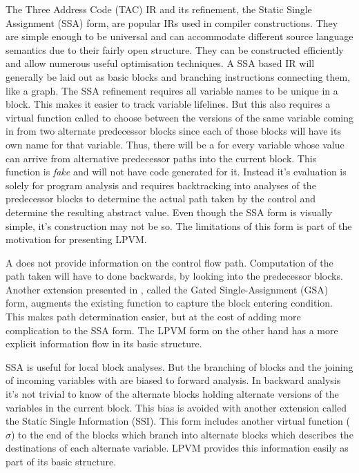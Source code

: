 The Three Address Code (TAC) IR and its refinement, the Static Single
Assignment (SSA) form, are popular IRs used in compiler constructions. They are
simple enough to be universal and can accommodate different source language
semantics due to their fairly open structure. They can be constructed
efficiently \citep{cytronSSA} and allow numerous useful optimisation
techniques. A SSA based IR will generally be laid out as basic blocks and
branching instructions connecting them, like a graph. The SSA refinement
requires all variable names to be unique in a block. This makes it easier to
track variable lifelines. But this also requires a virtual function called
\phif to choose between the versions of the same variable coming in from two
alternate predecessor blocks since each of those blocks will have its own name
for that variable. Thus, there will be a \phif for every variable whose value
can arrive from alternative predecessor paths into the current block. This
function is \textit{fake} and will not have code generated for it. Instead it's
evaluation is solely for program analysis and requires backtracking into
analyses of the predecessor blocks to determine the actual path taken by the
control and determine the resulting abstract value. Even though the SSA form is
visually simple, it's construction may not be so. The limitations of this form
is part of the motivation for presenting LPVM.

A \phif does not provide information on the control flow path. Computation of
the path taken will have to done backwards, by looking into the predecessor
blocks. Another extension presented in \cite{gsa}, called the Gated Single-Assignment
(GSA) form, augments the existing \phif function to capture the block
entering condition. This makes path determination easier, but at the cost of
adding more complication to the SSA form. The LPVM form on the other hand has a
more explicit information flow in its basic structure.

SSA is useful for local block analyses. But the branching of blocks and the
joining of incoming variables with \phifs are biased to forward analysis. In
backward analysis it's not trivial to know of the alternate blocks holding
alternate versions of the variables in the current block. This bias is avoided
with another extension called the Static Single Information (SSI). This form
includes another virtual function ($\sigma$) to the end of the blocks which
branch into alternate blocks which describes the destinations of each alternate
variable. LPVM provides this information easily as part of its basic structure.


